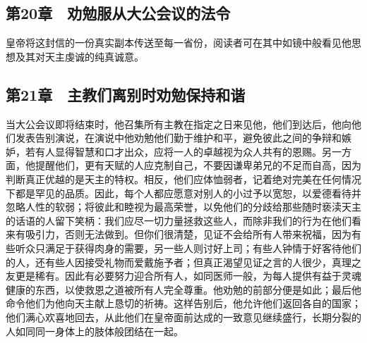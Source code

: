 
\subsection{第20章　劝勉服从大公会议的法令}

\par

皇帝将这封信的一份真实副本传送至每一省份，阅读者可在其中如镜中般看见他思想及其对天主虔诚的纯真诚意。\par


\subsection{第21章　主教们离别时劝勉保持和谐}

当大公会议即将结束时，他召集所有主教在指定之日来见他，他们到达后，他向他们发表告别演说，在演说中他劝勉他们勤于维护和平，避免彼此之间的争辩和嫉妒，若有人显得智慧和口才出众，应将一人的卓越视为众人共有的恩赐。另一方面，他提醒他们，更有天赋的人应克制自己，不要因谦卑弟兄的不足而自高，因为判断真正优越的是天主的特权。相反，他们应体恤弱者，记着绝对完美在任何情况下都是罕见的品质。因此，每个人都应愿意对别人的小过予以宽恕，以爱德看待并忽略人性的软弱；将彼此和睦视为最高荣誉，以免他们的分歧给那些随时亵渎天主的话语的人留下笑柄：我们应尽一切力量拯救这些人，而除非我们的行为在他们看来有吸引力，否则无法做到。但你们很清楚，见证不会给所有人带来祝福，因为有些听众只满足于获得肉身的需要，另一些人则讨好上司；有些人钟情于好客待他们的人，还有些人因接受礼物而爱戴施予者；但真正渴望见证之言的人很少，真理之友更是稀有。因此有必要努力迎合所有人，如同医师一般，为每人提供有益于灵魂健康的东西，以使救恩之道被所有人完全尊重。他劝勉的前部分便是如此；最后他命令他们为他向天主献上恳切的祈祷。这样告别后，他允许他们返回各自的国家；他们满心欢喜地回去，从此他们在皇帝面前达成的一致意见继续盛行，长期分裂的人如同同一身体上的肢体般团结在一起。\par

